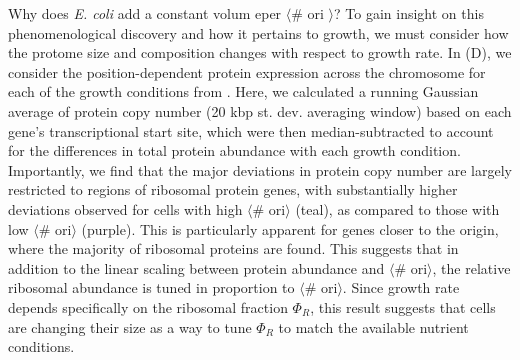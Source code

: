 Why does \textit{E. coli} add a constant volum eper $\langle$\# ori $\rangle$?
To gain insight on this phenomenological discovery and how it pertains to
growth, we must consider how the protome size and composition changes with
respect to growth rate.  In (D), we consider the
position-dependent protein expression across the chromosome for each of the
growth conditions from \cite{schmidt2016}. Here, we calculated a running
Gaussian average of protein copy number (20 kbp st. dev. averaging window) based on each gene's transcriptional start site, which were then
median-subtracted to account for the differences in total protein abundance with each
growth condition. Importantly, we find that the major deviations in protein copy
number are largely restricted to regions of ribosomal protein genes, with
substantially higher deviations observed for cells with high $\langle$\#
ori$\rangle$ (teal), as compared to those with low $\langle$\# ori$\rangle$
(purple). This is particularly apparent for genes closer to the origin, where
the majority of ribosomal proteins are found. This suggests that in addition
to the linear scaling between protein abundance and $\langle$\# ori$\rangle$,
the relative ribosomal abundance is tuned in proportion to
$\langle$\# ori$\rangle$. Since growth rate depends specifically on the
ribosomal fraction $\Phi_R$, this result suggests that cells are changing their
size as a way to tune $\Phi_R$ to match the available nutrient conditions.





